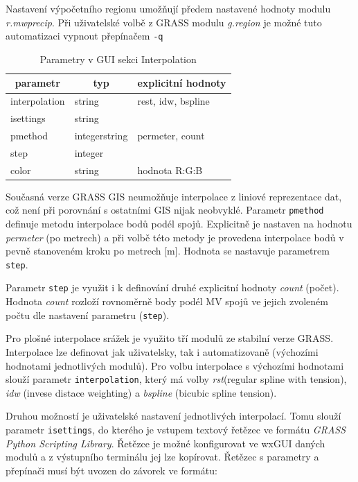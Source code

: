 \documentclass[a4paper,12pt,oneside]{report}
\begin{document}
Nastavení výpočetního regionu umožňují předem nastavené hodnoty
modu\-lu \textit{r.mwprecip}. Při uživatelské volbě z GRASS modulu
\textit{g.region} je možné tuto automatizaci vypnout přepínačem
\texttt{-q}
\begin{table}[h]
\centering
\begin{tabular}{|lll|}
\hline
\multicolumn{1}{|c}{parametr} & \multicolumn{1}{c}{typ} & \multicolumn{1}{c|}{explicitní hodnoty} \\ \hline\hline
interpolation                          & string                  & rest, idw, bspline           \\
isettings                              & string                  &                              \\
pmethod                                & integerstring           & permeter, count              \\
step                                   & integer                 &                              \\
color                                  & string                  & hodnota R:G:B                \\ \hline
\end{tabular}
\caption{Parametry v GUI sekci Interpolation}
\end{table}
Současná verze GRASS GIS neumožňuje interpolace z liniové reprezentace
dat, což není při porovnání s ostatními GIS nijak neobvyklé. Parametr
\texttt{pmethod} definuje metodu interpolace bodů podél
spojů. Explicitně je nastaven na hodnotu \emph{permeter} (po metrech)
a při volbě této metody je provedena interpolace bodů v pevně
stanoveném kroku po metrech [m]. Hodnota se nastavuje parametrem
\texttt{step}.

Parametr \texttt{step} je využit i k definování druhé explicitní
hodnoty \emph{count} (počet). Hodnota \emph{count} rozloží rovnoměrně
body podél MV spojů ve jejich zvoleném počtu dle nastavení parametru
(\texttt{step}).

Pro plošné interpolace srážek je využito tří modulů ze stabilní verze
GRASS. Interpolace lze definovat jak uživatelsky, tak i automatizovaně
(výchozími hodnotami jednotlivých modulů). Pro volbu interpolace s
výchozími hodnotami slouží parametr \texttt{interpolation}, který má
volby \emph{rst}(regular spline with tension), \emph{idw} (invese
distace weighting) a \emph{bspline} (bicubic spline tension).

Druhou možností je uživatelské nastavení jednotlivých interpolací. Tomu
 slouží parametr \texttt{isettings}, do kterého je
vstupem textový řetězec ve formátu \textit{GRASS Python Scripting
  Library}.  Řetězce je možné konfigurovat ve wxGUI daných modulů a z
výstupního terminálu jej lze kopírovat. Řetězec s parametry a přepínači
musí být uvozen do závorek ve formátu:
\end{document}
